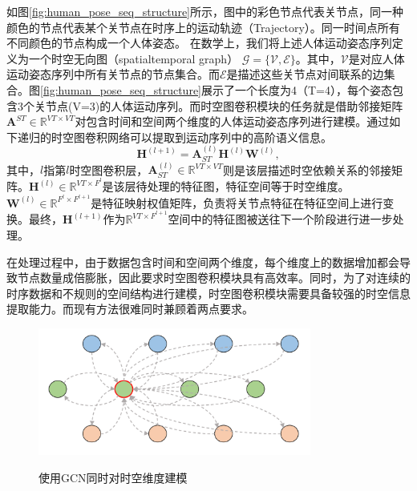 如图\ref{fig:human_pose_seq_structure}所示，图中的彩色节点代表关节点，同一种颜色的节点代表某个关节点在时序上的运动轨迹（Trajectory）。同一时间点所有不同颜色的节点构成一个人体姿态。
在数学上，我们将上述人体运动姿态序列定义为一个时空无向图（spatialtemporal graph） $\mathcal{G} = \{\mathcal{V,E}\}$。其中，$\mathcal{V}$是对应人体运动姿态序列中所有关节点的节点集合。而$\mathcal{E}$是描述这些关节点对间联系的边集合。图\ref{fig:human_pose_seq_structure}展示了一个长度为4（T=4），每个姿态包含3个关节点(V=3)的人体运动序列。而时空图卷积模块的任务就是借助邻接矩阵$\mathbf{A}^{ST} \in \mathbb{R}^{VT\times VT}$对包含时间和空间两个维度的人体运动姿态序列进行建模。通过如下递归的时空图卷积网络可以提取到运动序列中的高阶语义信息。
\begin{equation}
    \mathbf{H}^{(l+1)}= \mathbf{A}_{ST}^{(l)}\mathbf{H}^{(l)}\mathbf{W}^{(l)},
    \label{equation:graph-conv}
\end{equation}
其中，$l$指第$l$时空图卷积层，$\mathbf{A}_{ST}^{(l)}\in \mathbb{R}^{VT\times VT}$则是该层描述时空依赖关系的邻接矩阵。$\mathbf{H}^{(l)}\in \mathbb{R}^{VT\times F^l}$是该层待处理的特征图，特征空间等于时空维度。$\mathbf{W}^{(l)}\in \mathbb{R}^{F^l\times F^{l+1}}$是特征映射权值矩阵，负责将关节点特征在特征空间上进行变换。最终，$\mathbf{H}^{(l+1)}$作为$\mathbb{R}^{VT\times F^{l+1}}$空间中的特征图被送往下一个阶段进行进一步处理。

在处理过程中，由于数据包含时间和空间两个维度，每个维度上的数据增加都会导致节点数量成倍膨胀，因此要求时空图卷积模块具有高效率。同时，为了对连续的时序数据和不规则的空间结构进行建模，时空图卷积模块需要具备较强的时空信息提取能力。而现有方法很难同时兼顾着两点要求。

\begin{figure}[ht]
    \centering
    \includegraphics[width=0.80\textwidth]{FigMa/original_gcn.png}\\
    \vspace{-0.3cm}
    \caption{使用GCN同时对时空维度建模}
    \label{fig:original_gcn_structure}
\end{figure}

